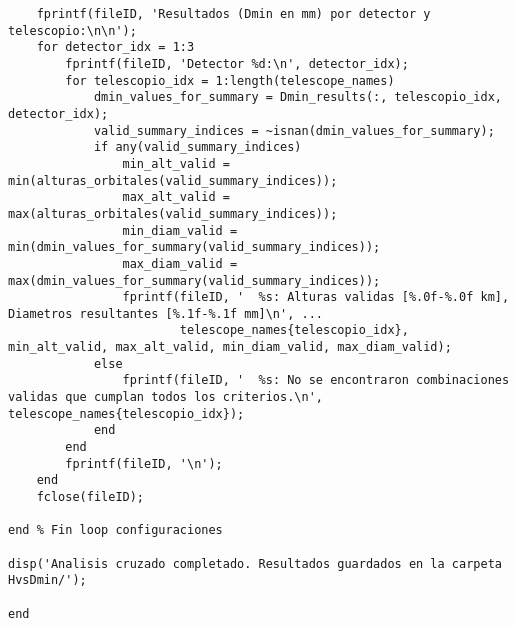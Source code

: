 \begin{verbatim}
    fprintf(fileID, 'Resultados (Dmin en mm) por detector y telescopio:\n\n');
    for detector_idx = 1:3
        fprintf(fileID, 'Detector %d:\n', detector_idx);
        for telescopio_idx = 1:length(telescope_names)
            dmin_values_for_summary = Dmin_results(:, telescopio_idx, detector_idx);
            valid_summary_indices = ~isnan(dmin_values_for_summary);
            if any(valid_summary_indices)
                min_alt_valid = min(alturas_orbitales(valid_summary_indices));
                max_alt_valid = max(alturas_orbitales(valid_summary_indices));
                min_diam_valid = min(dmin_values_for_summary(valid_summary_indices));
                max_diam_valid = max(dmin_values_for_summary(valid_summary_indices));
                fprintf(fileID, '  %s: Alturas validas [%.0f-%.0f km], Diametros resultantes [%.1f-%.1f mm]\n', ...
                        telescope_names{telescopio_idx}, min_alt_valid, max_alt_valid, min_diam_valid, max_diam_valid);
            else
                fprintf(fileID, '  %s: No se encontraron combinaciones validas que cumplan todos los criterios.\n', telescope_names{telescopio_idx});
            end
        end
        fprintf(fileID, '\n');
    end
    fclose(fileID);

end % Fin loop configuraciones

disp('Analisis cruzado completado. Resultados guardados en la carpeta HvsDmin/');

end



\end{verbatim}